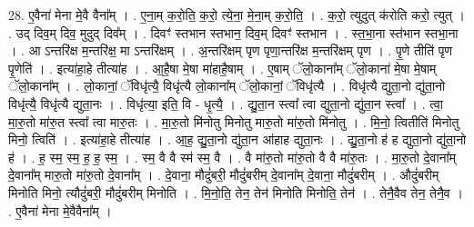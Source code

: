 \documentclass[17pt]{extarticle}
\begin{document}
28. ए॒वैना॑ मेना मे॒वै वैना᳚म् । . ए॒ना॒म् क॒रो॒ति॒ क॒रो॒ त्ये॒ना॒ मे॒ना॒म् क॒रो॒ति॒ । . क॒रो॒ त्युदुत् क॑रोति करो॒ त्युत् । . उद् दिव॒म् दिव॒ मुदुद् दिव᳚म् । . दिवꣳ॑ स्तभान स्तभान॒ दिव॒म् दिवꣳ॑ स्तभान । . स्त॒भा॒ना स्त॑भान स्तभा॒ना । . आ ऽन्तरि॑क्ष म॒न्तरि॑क्ष॒ मा ऽन्तरि॑क्षम् । . अ॒न्तरि॑क्षम् पृण पृणा॒न्तरि॑क्ष म॒न्तरि॑क्षम् पृण । . पृ॒णे तीति॑ पृण पृ॒णेति॑ । . इत्या॑हा॒हे तीत्या॑ह । . आ॒है॒षा मे॒षा मा॑हाहै॒षाम् । . ए॒षाम् ॅलो॒काना᳚म् ॅलो॒काना॑ मे॒षा मे॒षाम् ॅलो॒काना᳚म् । . लो॒कानां॒ ॅविधृ॑त्यै॒ विधृ॑त्यै लो॒काना᳚म् ॅलो॒कानां॒ ॅविधृ॑त्यै । . विधृ॑त्यै द्युता॒नो द्यु॑ता॒नो विधृ॑त्यै॒ विधृ॑त्यै द्युता॒नः । . विधृ॑त्या॒ इति॒ वि - धृ॒त्यै॒ । . द्यु॒ता॒न स्त्वा᳚ त्वा द्युता॒नो द्यु॑ता॒न स्त्वा᳚ । . त्वा॒ मा॒रु॒तो मा॑रु॒त स्त्वा᳚ त्वा मारु॒तः । . मा॒रु॒तो मि॑नोतु मिनोतु मारु॒तो मा॑रु॒तो मि॑नोतु । . मि॒नो॒ त्वितीति॑ मिनोतु मिनो॒ त्विति॑ । . इत्या॑हा॒हे तीत्या॑ह । . आ॒ह॒ द्यु॒ता॒नो द्यु॑ता॒न आ॑हाह द्युता॒नः । . द्यु॒ता॒नो ह॑ ह द्युता॒नो द्यु॑ता॒नो ह॑ । . ह॒ स्म॒ स्म॒ ह॒ ह॒ स्म॒ । . स्म॒ वै वै स्म॑ स्म॒ वै । . वै मा॑रु॒तो मा॑रु॒तो वै वै मा॑रु॒तः । . मा॒रु॒तो दे॒वाना᳚म् दे॒वाना᳚म् मारु॒तो मा॑रु॒तो दे॒वाना᳚म् । . दे॒वाना॒ मौदुं॑बरी॒ मौदुं॑बरीम् दे॒वाना᳚म् दे॒वाना॒ मौदुं॑बरीम् । . औदुं॑बरीम् मिनोति मिनो॒ त्यौदुं॑बरी॒ मौदुं॑बरीम् मिनोति । . मि॒नो॒ति॒ तेन॒ तेन॑ मिनोति मिनोति॒ तेन॑ । . तेनै॒वैव तेन॒ तेनै॒व । . ए॒वैना॑ मेना मे॒वैवैना᳚म् । \newline
\end{document}
